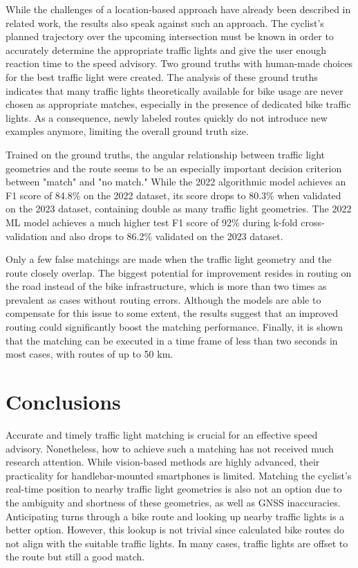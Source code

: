 \begin{Summary}
While the challenges of a location-based approach have already been described in related work, the results also speak against such an approach. The cyclist's planned trajectory over the upcoming intersection must be known in order to accurately determine the appropriate traffic lights and give the user enough reaction time to the speed advisory. Two ground truths with human-made choices for the best traffic light were created. The analysis of these ground truths indicates that many traffic lights theoretically available for bike usage are never chosen as appropriate matches, especially in the presence of dedicated bike traffic lights. As a consequence, newly labeled routes quickly do not introduce new examples anymore, limiting the overall ground truth size. 

Trained on the ground truths, the angular relationship between traffic light geometries and the route seems to be an especially important decision criterion between "match" and "no match." While the 2022 algorithmic model achieves an F1 score of 84.8\% on the 2022 dataset, its score drops to 80.3\% when validated on the 2023 dataset, containing double as many traffic light geometries. The 2022 ML model achieves a much higher test F1 score of 92\% during k-fold cross-validation and also drops to 86.2\% validated on the 2023 dataset. 

Only a few false matchings are made when the traffic light geometry and the route closely overlap. The biggest potential for improvement resides in routing on the road instead of the bike infrastructure, which is more than two times as prevalent as cases without routing errors. Although the models are able to compensate for this issue to some extent, the results suggest that an improved routing could significantly boost the matching performance. Finally, it is shown that the matching can be executed in a time frame of less than two seconds in most cases, with routes of up to 50 km. 
\end{Summary}

\section{Conclusions}

Accurate and timely traffic light matching is crucial for an effective speed advisory. Nonetheless, how to achieve such a matching has not received much research attention. While vision-based methods are highly advanced, their practicality for handlebar-mounted smartphones is limited. Matching the cyclist's real-time position to nearby traffic light geometries is also not an option due to the ambiguity and shortness of these geometries, as well as GNSS inaccuracies. Anticipating turns through a bike route and looking up nearby traffic lights is a better option. However, this lookup is not trivial since calculated bike routes do not align with the suitable traffic lights. In many cases, traffic lights are offset to the route but still a good match.

